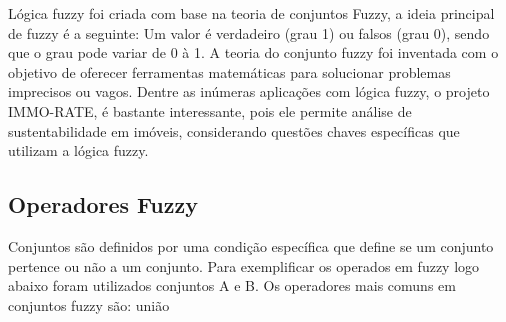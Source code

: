\documentclass[12pt]{article}
\begin{document}
Lógica fuzzy foi criada com base na teoria de conjuntos Fuzzy, a ideia principal de fuzzy é a seguinte: Um valor é verdadeiro (grau 1) ou falsos (grau 0), sendo que o grau pode variar de 0 à 1. A teoria do conjunto fuzzy foi inventada com o objetivo de oferecer ferramentas matemáticas para solucionar problemas imprecisos ou vagos. Dentre as inúmeras aplicações com lógica fuzzy, o projeto IMMO-RATE, é bastante interessante, pois ele permite análise de sustentabilidade em imóveis, considerando questões chaves específicas que utilizam a lógica fuzzy.

\subsection{Operadores Fuzzy}
Conjuntos são definidos por uma condição específica que define se um conjunto pertence ou não a um conjunto. Para exemplificar os operados em fuzzy logo abaixo foram utilizados conjuntos A e B.
Os operadores mais comuns em conjuntos fuzzy são: união 
\end{document}
